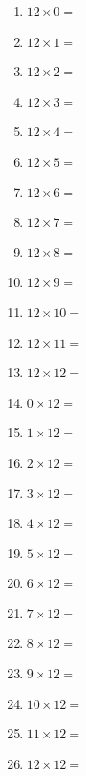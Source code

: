 \documentclass{article}
\begin{document}
\begin{multicols}{4}
\begin{enumerate}
\item $12 \times 0 =$
\item $12 \times 1 =$
\item $12 \times 2 =$
\item $12 \times 3 =$
\item $12 \times 4 =$
\item $12 \times 5 =$
\item $12 \times 6 =$
\item $12 \times 7 =$
\item $12 \times 8 =$
\item $12 \times 9 =$
\item $12 \times 10 =$
\item $12 \times 11 =$
\item $12 \times 12 =$

\item $0 \times 12 =$
\item $1 \times 12 =$
\item $2 \times 12 =$
\item $3 \times 12 =$
\item $4 \times 12 =$
\item $5 \times 12 =$
\item $6 \times 12 =$
\item $7 \times 12 =$
\item $8 \times 12 =$
\item $9 \times 12 =$
\item $10 \times 12 =$
\item $11 \times 12 =$
\item $12 \times 12 =$

\end{enumerate}
\end{multicols}
\end{document}
